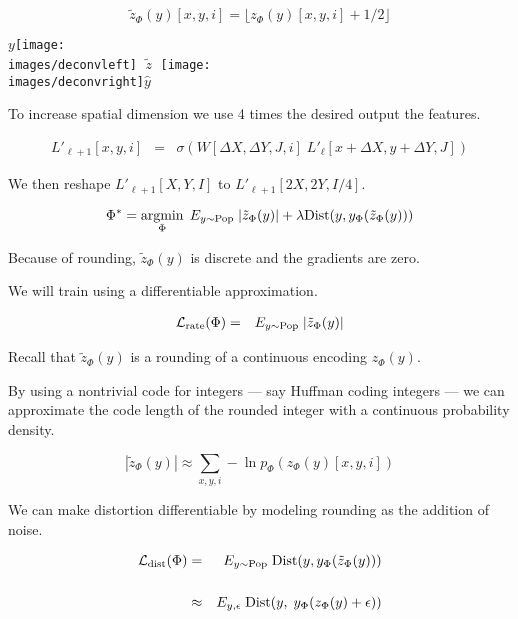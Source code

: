 {\vfill
$$\tilde{z}_\Phi(y)[x,y,i] = \lfloor z_\Phi(y)[x,y,i] + 1/2 \rfloor$$


\centerline{$y$\texttt{[image: \\images/deconvleft]} $\;\tilde{z}\;$ \texttt{[image: \\images/deconvright]}$\hat{y}$}


\vfill
To increase spatial dimension we use 4 times the desired output the features.

\begin{eqnarray*}
  L'_{\ell+1}[x,y,i] & = & \sigma\left(W[\Delta X, \Delta Y, J,i]\; L'_\ell[x + \Delta X, y + \Delta Y, J]\right)
\end{eqnarray*}

\vfill
We then reshape $L'_{\ell+1}[X,Y,I]$ to $L'_{\ell+1}[2X,2Y,I/4]$.


$$\Phi^* = \operatorname*{argmin}_\Phi \;E_{y \sim \mathrm{Pop}}\;|\tilde{z}_\Phi(y)| + \lambda \mathrm{Dist}(y,y_\Phi(\tilde{z}_\Phi(y)))$$

\vfill
Because of rounding, $\tilde{z}_\Phi(y)$ is discrete and the gradients are zero.

\vfill
We will train using a differentiable approximation.


\begin{eqnarray*}
{\cal L}_{\mathrm{rate}}(\Phi) & = & E_{y \sim \mathrm{Pop}}\;|\tilde{z}_\Phi(y)|
\end{eqnarray*}

\vfill
Recall that {\color{red} $\tilde{z}_\Phi(y)$} is a rounding of a continuous encoding {\color{red} $z_\Phi(y)$}.

\vfill
By using a nontrivial code for integers --- say Huffman coding integers ---
we can approximate the code length of the rounded integer with a continuous probability density.

\vfill
{\color{red} $$|\tilde{z}_\Phi(y)| \approx \sum_{x,y,i} -\ln p_\Phi(z_\Phi(y)[x,y,i])$$}


We can make distortion differentiable by modeling rounding as the addition of noise.

\begin{eqnarray*}
{\cal L}_{\mathrm{dist}}(\Phi) & = & E_{y \sim \mathrm{Pop}} \;\mathrm{Dist}(y,y_\Phi(\tilde{z}_\Phi(y))) \\
\\
& \approx & E_{y,\epsilon} \;\mathrm{Dist}(y,\;y_\Phi(z_\Phi(y) + \epsilon))
\end{eqnarray*}

}
